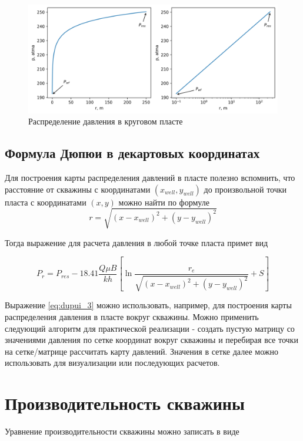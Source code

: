 \begin{figure}[h!]
	\begin{center}
		\includegraphics[width=12cm]{pics/stac_pressure_dist_1.png}
		\caption{Распределение давления в круговом пласте}
		\label{ris:stac_pressure_dist_1}
	\end{center}
\end{figure}


\subsection{Формула Дюпюи в декартовых координатах}
Для построения карты распределения давлений в пласте полезно вспомнить, что расстояние от скважины с координатами $(x_{well}, y_{well})$ до произвольной точки пласта с координатами $(x,y)$ можно найти по формуле 
$$r=\sqrt{ (x-x_{well})^2 + (y-y_{well})^2 }$$

Тогда выражение для расчета давления в любой точке пласта примет вид

\begin{equation} \label{eq:dupui_3}
	P_{r} = P_{res} - 18.41\dfrac{ Q\mu B }{kh} \left[ \ln\dfrac{r_e}{\sqrt{ (x-x_{well})^2 + (y-y_{well})^2 }} +S \right]
\end{equation}

Выражение \ref{eq:dupui_3} можно использовать, например, для построения карты распределения давления в пласте вокруг скважины. Можно применить следующий алгоритм для практической реализации - создать пустую матрицу со значениями давления по сетке координат вокруг скважины и перебирая все точки на сетке/матрице рассчитать карту давлений. Значения в сетке далее можно использовать для визуализации или последующих расчетов.


\section{Производительность скважины}

Уравнение производительности скважины можно записать в виде

